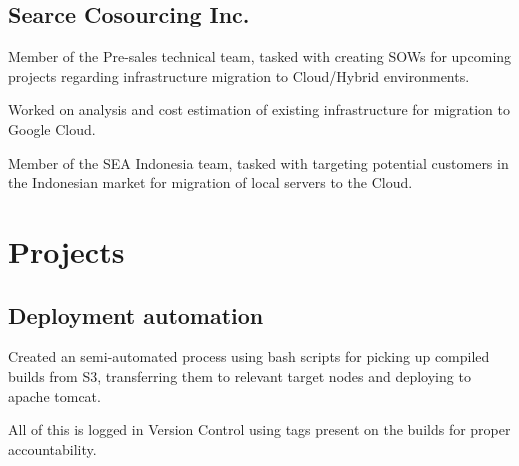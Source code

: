 \documentclass[]{plushcv}
\begin{document}
\begin{minipage}[t]{0.8\textwidth}
\subsection{Searce Cosourcing Inc.}
\begin{tightemize}
\sectionsep
\item[\textbullet{}] Member of the Pre-sales technical team, tasked with creating SOWs for upcoming projects regarding infrastructure migration to Cloud/Hybrid environments.
\item[\textbullet{}] Worked on analysis and cost estimation of existing infrastructure for migration to Google Cloud.
\item[\textbullet{}]  Member of the SEA Indonesia team, tasked with targeting potential customers in the Indonesian market for migration of local servers to the Cloud.  
\end{tightemize}
\sectionsep


\vspace{-0.375cm}
\section{Projects}
\subsection{Deployment automation}
\begin{tightemize}
\item[\textbullet{}] Created an semi-automated process using bash scripts for picking up compiled builds from S3, transferring them to relevant target nodes and deploying to apache tomcat.
\item[\textbullet{}] All of this is logged in Version Control using tags present on the builds for proper accountability.
\end{tightemize}
\sectionsep


\end{minipage}
\end{document}
